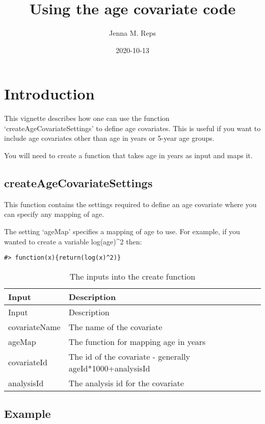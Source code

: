 \documentclass[
]{article}
\title{Using the age covariate code}
\author{Jenna M. Reps}
\date{2020-10-13}
\begin{document}
\maketitle

{
\setcounter{tocdepth}{2}
\tableofcontents
}
\hypertarget{introduction}{%
\section{Introduction}\label{introduction}}

This vignette describes how one can use the function
`createAgeCovariateSettings' to define age covariates. This is useful if
you want to include age covariates other than age in years or 5-year age
groups.

You will need to create a function that takes age in years as input and
maps it.

\hypertarget{createagecovariatesettings}{%
\subsection{createAgeCovariateSettings}\label{createagecovariatesettings}}

This function contains the settings required to define an age covariate
where you can specify any mapping of age.

The setting `ageMap' specifies a mapping of age to use. For example, if
you wanted to create a variable log(age)\^{}2 then:

\begin{verbatim}
#> function(x){return(log(x)^2)}
\end{verbatim}

\begin{longtable}[]{@{}ll@{}}
\caption{The inputs into the create function}\tabularnewline
\toprule
Input & Description\tabularnewline
\midrule
\endfirsthead
\toprule
Input & Description\tabularnewline
\midrule
\endhead
covariateName & The name of the covariate\tabularnewline
ageMap & The function for mapping age in years\tabularnewline
covariateId & The id of the covariate - generally
ageId*1000+analysisId\tabularnewline
analysisId & The analysis id for the covariate\tabularnewline
\bottomrule
\end{longtable}

\hypertarget{example}{%
\subsection{Example}\label{example}}
\end{document}
